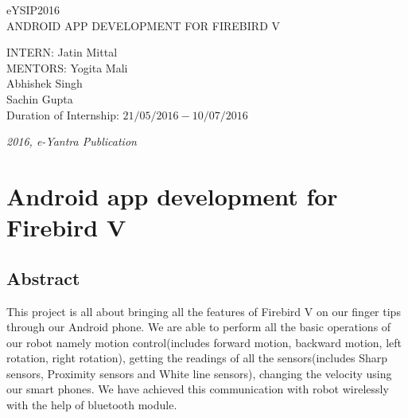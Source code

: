 \documentclass[a4paper,12pt,oneside]{book}
\begin{document}
\begin{titlepage}
\raggedright
{\Large eYSIP2016\\[1cm]}
{\Huge\scshape ANDROID APP DEVELOPMENT FOR FIREBIRD V \\[.1in]}
\vfill
\begin{flushright}
{\large INTERN: Jatin Mittal\\}
{\large MENTORS: Yogita Mali \\}
{\large Abhishek Singh \\}
{\large Sachin Gupta \\}
{\large Duration of Internship: $ 21/05/2016-10/07/2016 $ \\}
\end{flushright}

{\itshape 2016, e-Yantra Publication}
\end{titlepage}

\chapter[Project Tag]{Android app development for Firebird V}
\section*{Abstract}
	This project is all about bringing all the features of Firebird V on our finger tips through our Android phone. We are able to perform all the basic operations of our robot namely motion control(includes forward motion, backward motion, left rotation, right rotation), getting the readings of all the sensors(includes Sharp sensors, Proximity sensors and White line sensors), changing the velocity using our smart phones. We have achieved this communication with robot wirelessly with the help of bluetooth module.
\newpage
\end{document}
